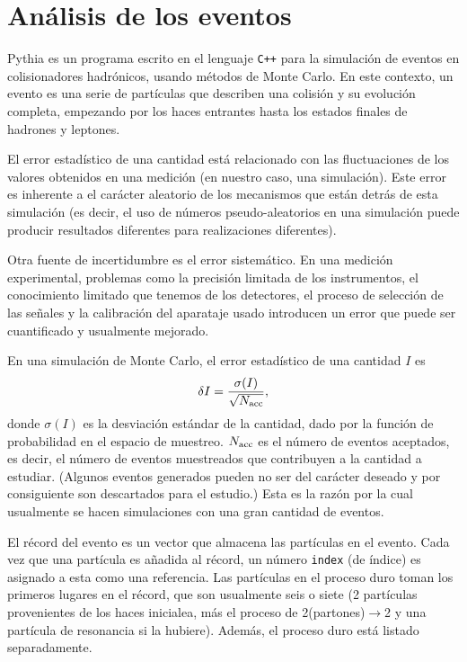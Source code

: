 \chapter{Análisis de los eventos}
\label{sec:analysis}

Pythia es un programa escrito en el lenguaje \verb|C++| para la simulación de eventos en colisionadores hadrónicos, usando métodos de Monte Carlo. En este contexto, un evento es una serie de partículas que describen una colisión y su evolución completa, empezando por los haces entrantes hasta los estados finales de hadrones y leptones.

El error estadístico de una cantidad está relacionado con las fluctuaciones de los valores obtenidos en una medición (en nuestro caso, una simulación). Este error es inherente a el carácter aleatorio de los mecanismos que están detrás de esta simulación (es decir, el uso de números pseudo-aleatorios en una simulación puede producir resultados diferentes para realizaciones diferentes).

Otra fuente de incertidumbre es el error sistemático. En una medición experimental, problemas como la precisión limitada de los instrumentos, el conocimiento limitado que tenemos de los detectores, el proceso de selección de las señales y la calibración del aparataje usado introducen un error que puede ser cuantificado y usualmente mejorado.

En una simulación de Monte Carlo, el error estadístico de una cantidad $I$ es
$$
\delta I = \frac{\sigma (I)}{\sqrt {N_{\mathrm{acc}}}},
$$
donde $\sigma(I)$ es la desviación estándar de la cantidad, dado por la función de probabilidad en el espacio de muestreo. $N_{\mathrm{acc}}$ es el número de eventos aceptados, es decir, el número de eventos muestreados que contribuyen a la cantidad a estudiar. (Algunos eventos generados pueden no ser del carácter deseado y por consiguiente son descartados para el estudio.) Esta es la razón por la cual usualmente se hacen simulaciones con una gran cantidad de eventos.

El récord del evento es un vector que almacena las partículas en el evento. Cada vez que una partícula es añadida al récord, un número \verb|index| (de índice) es asignado a esta como una referencia. Las partículas en el proceso duro toman los primeros lugares en el récord, que son usualmente seis o siete (2 partículas provenientes de los haces inicialea, más el proceso de 2(partones)$\to$2 y una partícula de resonancia si la hubiere). Además, el proceso duro está listado separadamente.

